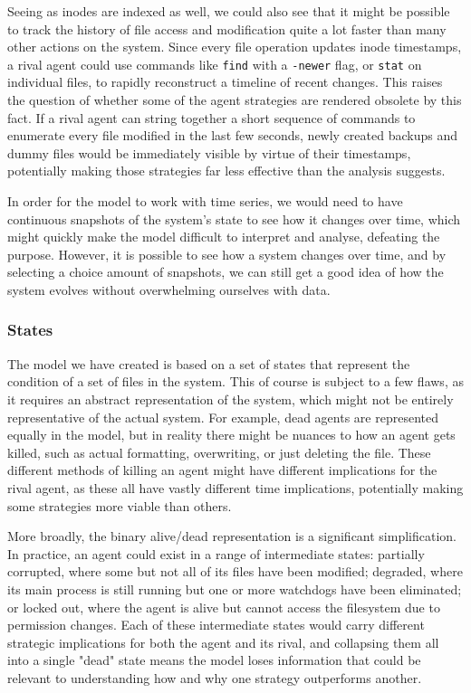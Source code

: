 Seeing as inodes are indexed as well, we could also see that it might be possible to track the history of file access and modification quite a lot faster than many other actions on the system. Since every file operation updates inode timestamps, a rival agent could use commands like \texttt{find} with a \texttt{-newer} flag, or \texttt{stat} on individual files, to rapidly reconstruct a timeline of recent changes. This raises the question of whether some of the agent strategies are rendered obsolete by this fact. If a rival agent can string together a short sequence of commands to enumerate every file modified in the last few seconds, newly created backups and dummy files would be immediately visible by virtue of their timestamps, potentially making those strategies far less effective than the analysis suggests. 

In order for the model to work with time series, we would need to have continuous snapshots of the system's state to see how it changes over time, which might quickly make the model difficult to interpret and analyse, defeating the purpose. However, it is possible to see how a system changes over time, and by selecting a choice amount of snapshots, we can still get a good idea of how the system evolves without overwhelming ourselves with data. 

\subsubsection{States}
\label{StatesDiscussion}

The model we have created is based on a set of states that represent the condition of a set of files in the system. This of course is subject to a few flaws, as it requires an abstract representation of the system, which might not be entirely representative of the actual system. For example, dead agents are represented equally in the model, but in reality there might be nuances to how an agent gets killed, such as actual formatting, overwriting, or just deleting the file. These different methods of killing an agent might have different implications for the rival agent, as these all have vastly different time implications, potentially making some strategies more viable than others.

More broadly, the binary alive/dead representation is a significant simplification. In practice, an agent could exist in a range of intermediate states: partially corrupted, where some but not all of its files have been modified; degraded, where its main process is still running but one or more watchdogs have been eliminated; or locked out, where the agent is alive but cannot access the filesystem due to permission changes. Each of these intermediate states would carry different strategic implications for both the agent and its rival, and collapsing them all into a single "dead" state means the model loses information that could be relevant to understanding how and why one strategy outperforms another.

